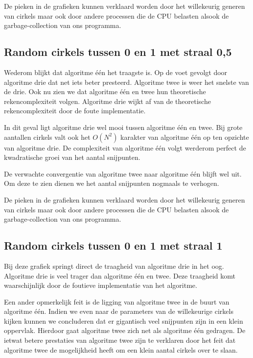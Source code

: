 \documentclass[11pt,a4paper]{article}
\begin{document}
De pieken in de grafieken kunnen verklaard worden door het willekeurig generen van cirkels maar ook door andere processen die de CPU belasten alsook de garbage-collection van ons programma. 

\subsection{Random cirkels tussen 0 en 1 met straal 0,5}

Wederom blijkt dat algoritme \'e\'en het traagste is. Op de voet gevolgt door algoritme drie dat net iets beter presteerd. Algoritme twee is weer het snelste van de drie. Ook nu zien we dat algoritme \'e\'en en twee hun theoretische rekencomplexiteit volgen. Algoritme drie wijkt af van de theoretische rekencomplexiteit door de foute implementatie.

In dit geval ligt algoritme drie wel mooi tussen algoritme \'e\'en en twee. Bij grote aantallen cirkels valt ook het $O(N^{2})$ karakter van algoritme \'e\'en op ten opzichte van algoritme drie. De complexiteit van algoritme \'e\'en volgt werderom perfect de kwadratische groei van het aantal snijpunten.

De verwachte convergentie van algoritme twee naar algoritme \'e\'en blijft wel uit. Om deze te zien dienen we het aantal snijpunten nogmaals te verhogen.

De pieken in de grafieken kunnen verklaard worden door het willekeurig generen van cirkels maar ook door andere processen die de CPU belasten alsook de garbage-collection van ons programma. 

\subsection{Random cirkels tussen 0 en 1 met straal 1}

Bij deze grafiek springt direct de traagheid van algoritme drie in het oog. Algoritme drie is veel trager dan algoritme \'e\'en en twee. Deze traagheid komt waarschijnlijk door de foutieve implementatie van het algoritme.

Een ander opmerkelijk feit is de ligging van algoritme twee in de buurt van algoritme \'e\'en. Indien we even naar de parameters van de willekeurige cirkels kijken kunnen we concluderen dat er gigantisch veel snijpunten zijn in een klein oppervlak. Hierdoor gaat algoritme twee zich net als algoritme \'e\'en gedragen. De ietwat betere prestaties van algoritme twee zijn te verklaren door het feit dat algoritme twee de mogelijkheid heeft om een klein aantal cirkels over te slaan.
\end{document}
